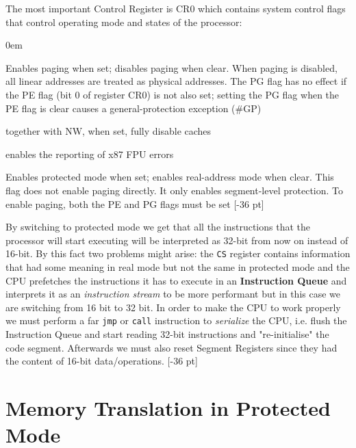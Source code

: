 \documentclass[twoside]{article}
\renewcommand{\cite}[1]{[#1]}
\begin{document}
The  most important Control Register is CR0 which contains system control flags that control operating mode and states of the processor:
\begin{description}
  \itemsep0em
  \item [PG Paging (bit 31):] Enables paging when set; disables paging when clear. When paging is
  disabled, all linear addresses are treated as physical addresses. The PG flag has no effect if the PE flag (bit
  0 of register CR0) is not also set; setting the PG flag when the PE flag is clear causes a general-protection
  exception (\#GP)
  \item [CD Cache Disable (bit 30):] together with NW, when set, fully disable caches
  \item [NW Not Write-through (bit 29)]
  \item [NE Numeric Error (bit 5):] enables the reporting of x87 FPU errors
  \item [PE Protection Enable (bit 0):] Enables protected mode when set; enables real-address mode when clear. This flag does not enable paging directly. It only enables segment-level protection. To enable paging, both the PE and PG flags must be set [-36 pt]
\end{description}

By switching to protected mode we get that all the instructions that the processor will start executing will be interpreted as 32-bit from now on instead of 16-bit. By this fact two problems might arise: the \texttt{CS} register contains information that had some meaning in real mode but not the same in protected mode and the CPU prefetches the instructions it has to execute in an \textbf{Instruction Queue} and interprets it as an \textit{instruction stream} to be more performant but in this case we are switching from 16 bit to 32 bit. In order to make the CPU to work properly we must perform a far \texttt{jmp} or \texttt{call} instruction to \textit{serialize} the CPU, i.e. flush the Instruction Queue and start reading 32-bit instructions and "re-initialise" the code segment. Afterwards we must also reset Segment Registers since they had the content of 16-bit data/operations. \marginnote{\cite{intel} Ch. 9, Sec. 9.9}[-36 pt]

\section{Memory Translation in Protected Mode}
\end{document}
